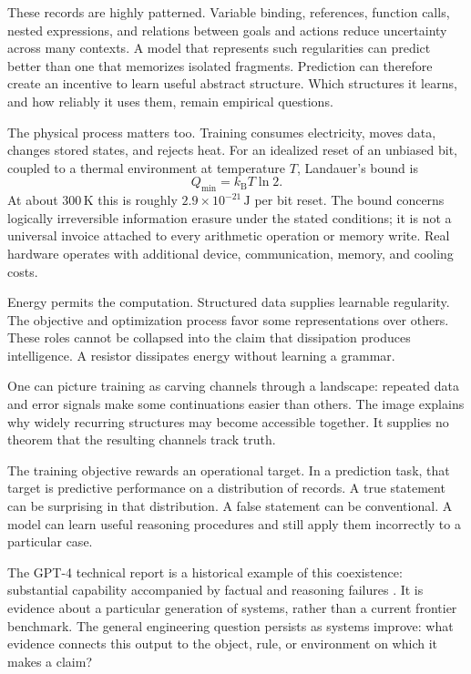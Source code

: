\documentclass[11pt,openany]{book}
\begin{document}
These records are highly patterned. Variable binding, references, function calls, nested expressions, and relations between goals and actions reduce uncertainty across many contexts. A model that represents such regularities can predict better than one that memorizes isolated fragments. Prediction can therefore create an incentive to learn useful abstract structure. Which structures it learns, and how reliably it uses them, remain empirical questions.

The physical process matters too. Training consumes electricity, moves data, changes stored states, and rejects heat. For an idealized reset of an unbiased bit, coupled to a thermal environment at temperature $T$, Landauer's bound is
\begin{equation}
 Q_{\min}=k_{\mathrm B}T\ln 2.
\end{equation}
At about $300\,\mathrm{K}$ this is roughly $2.9\times10^{-21}\,\mathrm{J}$ per bit reset. The bound concerns logically irreversible information erasure under the stated conditions; it is not a universal invoice attached to every arithmetic operation or memory write. Real hardware operates with additional device, communication, memory, and cooling costs.

Energy permits the computation. Structured data supplies learnable regularity. The objective and optimization process favor some representations over others. These roles cannot be collapsed into the claim that dissipation produces intelligence. A resistor dissipates energy without learning a grammar.

One can picture training as carving channels through a landscape: repeated data and error signals make some continuations easier than others. The image explains why widely recurring structures may become accessible together. It supplies no theorem that the resulting channels track truth.

The training objective rewards an operational target. In a prediction task, that target is predictive performance on a distribution of records. A true statement can be surprising in that distribution. A false statement can be conventional. A model can learn useful reasoning procedures and still apply them incorrectly to a particular case.

The GPT-4 technical report is a historical example of this coexistence: substantial capability accompanied by factual and reasoning failures \cite{openai2023gpt4}. It is evidence about a particular generation of systems, rather than a current frontier benchmark. The general engineering question persists as systems improve: what evidence connects this output to the object, rule, or environment on which it makes a claim?
\end{document}

